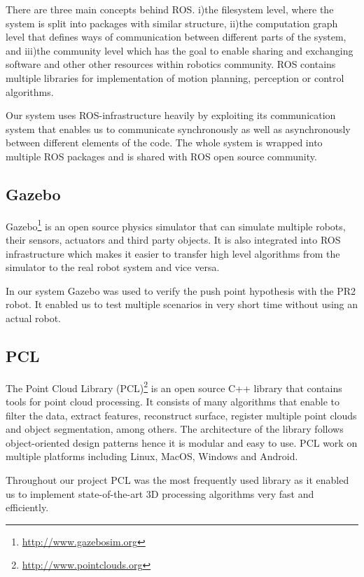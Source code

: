 There are three main concepts behind ROS. i)the filesystem level, where the system is split into packages with similar structure, ii)the computation graph level that defines ways of communication between different parts of the system, and iii)the community level which has the goal to enable sharing and exchanging software and other other resources within robotics community. ROS contains multiple libraries for implementation of motion planning, perception or control algorithms.

Our system uses ROS-infrastructure heavily by exploiting its communication system that enables us to communicate synchronously as well as asynchronously between different elements of the code. The whole system is wrapped into multiple ROS packages and is shared with ROS open source community.




\subsection{Gazebo}
Gazebo\footnote{\url{http://www.gazebosim.org}} is an open source physics simulator that can simulate multiple robots, their sensors, actuators and third party objects. It is also integrated into ROS infrastructure which makes it easier to transfer high level algorithms  from the simulator to the real robot system and vice versa.  

In our system Gazebo was used to verify the push point hypothesis with the PR2 robot. It enabled us to test multiple scenarios in very short time without using an actual robot.


\subsection{PCL}
The Point Cloud Library (PCL)\footnote{\url{http://www.pointclouds.org}} is an open source C++ library that contains tools for point cloud processing. It consists of many algorithms that enable to filter the data, extract features, reconstruct surface, register multiple point clouds and object segmentation, among others. The architecture of the library follows object-oriented design patterns hence it is modular and easy to use. PCL work on multiple platforms including Linux, MacOS, Windows and Android. 

Throughout our project PCL was the most frequently used library as it enabled us to implement state-of-the-art 3D processing algorithms very fast and efficiently.  

